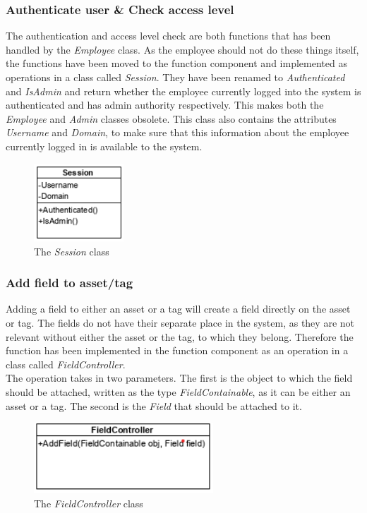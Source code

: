\subsubsection{Authenticate user \& Check access level}
The authentication and access level check are both functions that has been handled by the \textit{Employee} class. As the employee should not do these things itself, the functions have been moved to the function component and implemented as operations in a class called \textit{Session}. They have been renamed to \textit{Authenticated} and \textit{IsAdmin} and return whether the employee currently logged into the system is authenticated and has admin authority respectively. This makes both the \textit{Employee} and \textit{Admin} classes obsolete. This class also contains the attributes \textit{Username} and \textit{Domain}, to make sure that this information about the employee currently logged in is available to the system.
\begin{figure}[H]
    \centering
    \includegraphics[width=0.3\textwidth]{figures/FunctionComponent/Session.png}
    \caption{The \textit{Session} class}
    \label{fig:session_class}
\end{figure}

\subsubsection{Add field to asset/tag}
Adding a field to either an asset or a tag will create a field directly on the asset or tag. The fields do not have their separate place in the system, as they are not relevant without either the asset or the tag, to which they belong. Therefore the function has been implemented in the function component as an operation in a class called \textit{FieldController}.\\
The operation takes in two parameters. The first is the object to which the field should be attached, written as the type \textit{FieldContainable}, as it can be either an asset or a tag. The second is the \textit{Field} that should be attached to it.
\begin{figure}[H]
    \centering
    \includegraphics[width=0.6\textwidth]{figures/FunctionComponent/FieldController.png}
    \caption{The \textit{FieldController} class}
    \label{fig:FieldController}
\end{figure}

